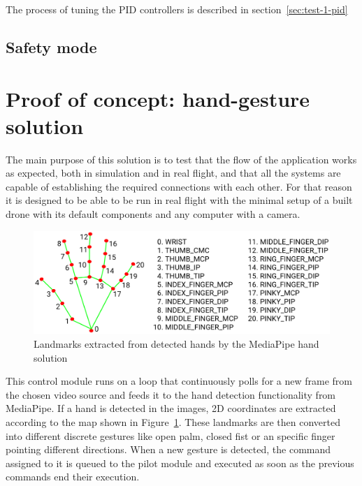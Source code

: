 The process of tuning the PID controllers is described in section~\ref{sec:test-1-pid}





\subsection{Safety mode}
\label{subsec:safety}


\section{Proof of concept: hand-gesture solution}
\label{sec:hands}
The main purpose of this solution is to test that the flow of the application works as expected, both in simulation and in real flight, and that all the systems are capable of establishing the required connections with each other.
For that reason it is designed to be able to be run in real flight with the minimal setup of a built drone with its default components and any computer with a camera.

\begin{figure}
  \centering
  \includegraphics[width=\textwidth, keepaspectratio]{img/hand_landmarks.png}
  \caption{Landmarks extracted from detected hands by the MediaPipe hand solution}\label{fig:hand-landmarks}
\end{figure}

This control module runs on a loop that continuously polls for a new frame from the chosen video source and feeds it to the hand detection functionality from MediaPipe.
If a hand is detected in the images, 2D coordinates are extracted according to the map shown in Figure~\ref{fig:hand-landmarks}.
These landmarks are then converted into different discrete gestures like open palm, closed fist or an specific finger pointing different directions.
When a new gesture is detected, the command assigned to it is queued to the pilot module and executed as soon as the previous commands end their execution.

